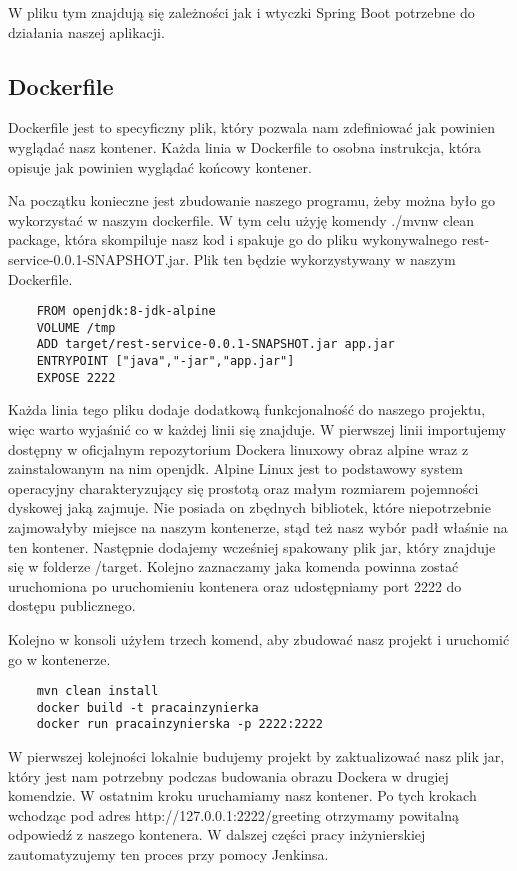 W pliku tym znajdują się zależności jak i wtyczki Spring Boot potrzebne do działania naszej aplikacji. 

\subsection{Dockerfile} 

Dockerfile jest to specyficzny plik, który pozwala nam zdefiniować jak powinien wyglądać nasz kontener. Każda linia w Dockerfile to osobna instrukcja, która opisuje jak powinien wyglądać końcowy kontener. 

Na początku konieczne jest zbudowanie naszego programu, żeby można było go wykorzystać w naszym dockerfile. W tym celu użyję komendy ./mvnw clean package, która skompiluje nasz kod i spakuje go do pliku wykonywalnego rest-service-0.0.1-SNAPSHOT.jar. Plik ten będzie wykorzystywany w naszym Dockerfile. 

\begin{lstlisting}
    FROM openjdk:8-jdk-alpine
    VOLUME /tmp
    ADD target/rest-service-0.0.1-SNAPSHOT.jar app.jar
    ENTRYPOINT ["java","-jar","app.jar"]
    EXPOSE 2222
\end{lstlisting}


Każda linia tego pliku dodaje dodatkową funkcjonalność do naszego projektu, więc warto wyjaśnić co w każdej linii się znajduje. W pierwszej linii importujemy dostępny w oficjalnym repozytorium Dockera linuxowy obraz alpine wraz z zainstalowanym na nim openjdk. Alpine Linux jest to podstawowy system operacyjny charakteryzujący się prostotą oraz małym rozmiarem pojemności dyskowej jaką zajmuje. Nie posiada on zbędnych bibliotek, które niepotrzebnie zajmowałyby miejsce na naszym kontenerze, stąd też nasz wybór padł właśnie na ten kontener. Następnie dodajemy wcześniej spakowany plik jar, który znajduje się w folderze /target. Kolejno zaznaczamy jaka komenda powinna zostać uruchomiona po uruchomieniu kontenera oraz udostępniamy port 2222 do dostępu publicznego. 

Kolejno w konsoli użyłem trzech komend, aby zbudować nasz projekt i uruchomić go w kontenerze. 
\begin{lstlisting}
    mvn clean install 
    docker build -t pracainzynierka
    docker run pracainzynierska -p 2222:2222
\end{lstlisting}
W pierwszej kolejności lokalnie budujemy projekt by zaktualizować nasz plik jar, który jest nam potrzebny podczas budowania obrazu Dockera w drugiej komendzie. W ostatnim kroku uruchamiamy nasz kontener. Po tych krokach wchodząc pod adres http://127.0.0.1:2222/greeting otrzymamy powitalną odpowiedź z naszego kontenera. 
W dalszej części pracy inżynierskiej zautomatyzujemy ten proces przy pomocy Jenkinsa. 

